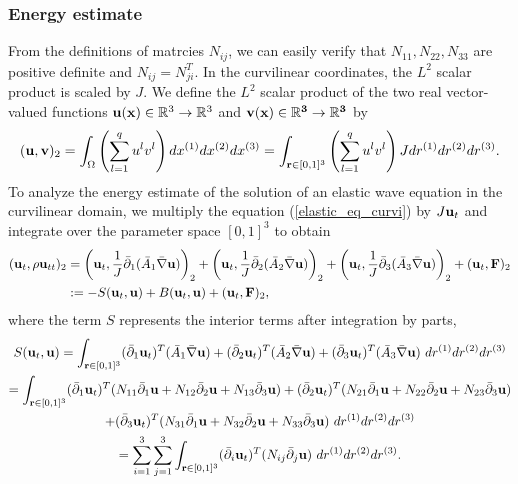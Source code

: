 \documentclass[a4paper]{article}
\begin{document}
\subsubsection{Energy estimate}
From the definitions of matrcies $N_{ij}$, we can easily verify that $N_{11}, N_{22}, N_{33}$ are positive definite and $N_{ij} = N_{ji}^T$. In the curvilinear coordinates, the $L^2$ scalar product is scaled by $J$. We define the $L^2$ scalar product of the two real vector-valued functions ${\bf u}({\bf x})\in\mathbb{R}^3\rightarrow \mathbb{R}^3$ and ${\bf v}(\bf x)\in\mathbb{R}^3\rightarrow \mathbb{R}^3$ by
\begin{equation*}
({\bf u},{\bf v})_2 = \int_{\Omega}  \left(\sum_{l=1}^q u^{l}v^{l}\right)dx^{(1)}dx^{(2)}dx^{(3)} = \int_{{\bf r}\in[0,1]^3} \left(\sum_{l=1}^q u^{l}v^{l}\right)Jdr^{(1)}dr^{(2)}dr^{(3)}.
\end{equation*}
To analyze the energy estimate of the solution of an elastic wave equation in the curvilinear domain, we multiply the equation (\ref{elastic_eq_curvi}) by $J{\bf u}_t$ and integrate over the parameter space $[0,1]^3$ to obtain
\begin{align}\label{time_deri_curvi}
({\bf u}_t,\rho {\bf u}_{tt})_2 &= \left({\bf u}_t,\frac{1}{J}\bar{\partial}_1(\bar{A}_1\bar{\nabla}{\bf u})\right)_2+ \left({\bf u}_t,\frac{1}{J}\bar{\partial}_2(\bar{A}_2\bar{\nabla}{\bf u})\right)_2+ \left({\bf u}_t,\frac{1}{J}\bar{\partial}_3(\bar{A}_3\bar{\nabla}{\bf u})\right)_2+({\bf u}_t, {\bf F})_2\nonumber\\
&:= -S({\bf u}_t,{\bf u}) + B({\bf u}_t,{\bf u}) + ({\bf u}_t,{\bf F})_2,
\end{align}
where the term $S$ represents the interior terms after integration by parts,
\begin{multline*}
S({\bf u}_t,{\bf u}) = \int_{{\bf r}\in[0,1]^3} (\bar{\partial}_1 {\bf u}_t)^T ({\bar A}_1\bar{\nabla}{\bf u}) + (\bar{\partial}_2 {\bf u}_t)^T ({\bar A}_2\bar{\nabla}{\bf u}) + (\bar{\partial}_3 {\bf u}_t)^T ({\bar A}_3\bar{\nabla}{\bf u})\ dr^{(1)}dr^{(2)}dr^{(3)}\\
 = \int_{{\bf r}\in[0,1]^3} (\bar{\partial}_1 {\bf u}_t)^T (N_{11}\bar{\partial}_1{\bf u} +N_{12}\bar{\partial}_2{\bf u}+ N_{13}\bar{\partial}_3{\bf u}) + (\bar{\partial}_2 {\bf u}_t)^T (N_{21}\bar{\partial}_1{\bf u} +N_{22}\bar{\partial}_2{\bf u}+ N_{23}\bar{\partial}_3{\bf u}) \\
 +(\bar{\partial}_3 {\bf u}_t)^T (N_{31}\bar{\partial}_1{\bf u} +N_{32}\bar{\partial}_2{\bf u}+ N_{33}\bar{\partial}_3{\bf u})\ dr^{(1)}dr^{(2)}dr^{(3)}\\
 = \sum_{i = 1}^3\sum_{j=1}^3  \int_{{\bf r}\in[0,1]^3} (\bar{\partial}_i {\bf u}_t)^T(N_{ij}\bar{\partial}_j {\bf u})\ dr^{(1)}dr^{(2)}dr^{(3)}.
\end{multline*}
\end{document}
